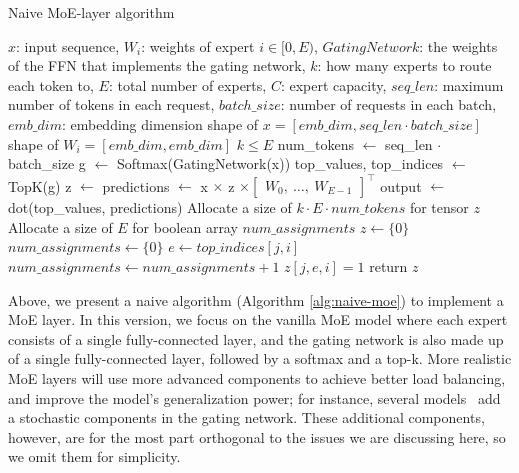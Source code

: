 \begin{algorithm}[H]
  \caption{Naive MoE-layer algorithm}
  \label{alg:naive-moe}
  \small
  \begin{algorithmic}[1]
    \Ensure $x$: input sequence, $W_{i}$: weights of expert $i \in [0, E)$, $GatingNetwork$: the weights of the FFN that implements the gating network, $k$: how many experts to route each token to, $E$: total number of experts, $C$: expert capacity, $seq\_len$: maximum number of tokens in each request, $batch\_size$: number of requests in each batch, $emb\_dim$: embedding dimension
    \Require shape of $x = [emb\_dim, seq\_len \cdot batch\_size]$
    \Require shape of $W_{i} = [emb\_dim, emb\_dim]$
    \Require $k \leq E$
    \State num\_tokens $\leftarrow$ seq\_len $\cdot$ batch\_size
    \State g $\leftarrow$ Softmax(GatingNetwork(x))
    \State top\_values, top\_indices $\leftarrow$ TopK(g)
    \State z $\leftarrow$ 
    \State predictions $\leftarrow$ x $\times$ z $\times \begin{bmatrix} W_0, \ \dots, \ W_{E-1} \end{bmatrix}^\top$
    \State output $\leftarrow$ dot(top\_values, predictions)
    \State 
        \State Allocate a size of $k \cdot E \cdot num\_tokens $ for tensor $z$
        \State Allocate a size of $E$ for boolean array $num\_assignments$
        \State $z \leftarrow \{0\}$
        \State $num\_assignments \leftarrow \{0\}$
                \State $e \leftarrow top\_indices[j,i]$
                    \State $num\_assignments \leftarrow num\_assignments + 1$
                    \State $z[j,e,i] = 1$
                \EndIf
            \EndFor
        \EndFor
        \State return $z$
    \EndProcedure
  \end{algorithmic}
\end{algorithm}

Above, we present a naive algorithm (Algorithm \ref{alg:naive-moe}) to implement a MoE layer. In this version, we focus on the vanilla MoE model where each expert consists of a single fully-connected layer, and the gating network is also made up of a single fully-connected layer, followed by a softmax and a top-k. More realistic MoE layers will use more advanced components to achieve better load balancing, and improve the model's generalization power; for instance, several models~\cite{g-shard, original_moe}  add a stochastic components in the gating network. These additional components, however, are for the most part orthogonal to the issues we are discussing here, so we omit them for simplicity.

